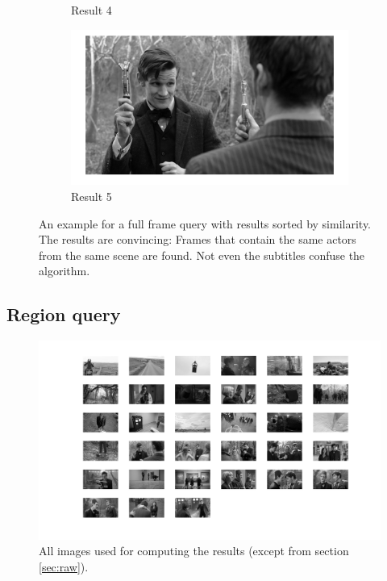 \documentclass{paper}
\begin{document}
\begin{figure}
\begin{subfigure}[b]{0.32\textwidth}
  	\caption{Result 4}
  \end{subfigure}
  \begin{subfigure}[b]{0.32\textwidth}
  	\includegraphics[width=\textwidth]{full_frame_query_result5}
  	\caption{Result 5}
  \end{subfigure}
  \caption{An example for a full frame query with results sorted by similarity. 
  The results are convincing: Frames that contain
  the same actors from the same scene are found. 
  Not even the subtitles confuse the algorithm.}
  \label{fig:full_frame_query}
\end{figure}
\subsection{Region query}


\begin{figure}
  \centering
  \includegraphics[width=\textwidth]{img_db}
  \caption{All images used for computing the results (except from section \ref{sec:raw}).}
\end{figure}
\end{document}
